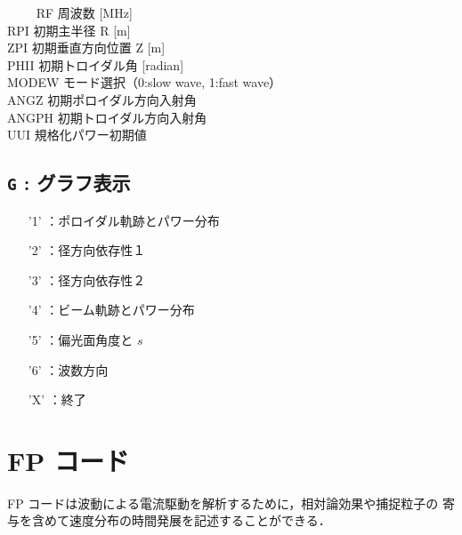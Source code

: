 \documentclass[11pt]{jarticle}
\begin{document}
\begin{itemize}
\begin{tabbing}
　　  \> RF    \>周波数 [MHz] \\
      \> RPI   \>初期主半径 R [m] \\
      \> ZPI   \>初期垂直方向位置 Z [m]\\
      \> PHII  \>初期トロイダル角 [radian]\\
      \> MODEW \>モード選択（0:slow wave, 1:fast wave）\\
      \> ANGZ  \>初期ポロイダル方向入射角 \\
      \> ANGPH \>初期トロイダル方向入射角\\
      \> UUI   \>規格化パワー初期値\\
\end{tabbing}   
\end{itemize}

\subsection{{\tt G} : グラフ表示}
\begin{itemize}
\item['1']：ポロイダル軌跡とパワー分布
\item['2']：径方向依存性１
\item['3']：径方向依存性２
\item['4']：ビーム軌跡とパワー分布
\item['5']：偏光面角度と $s$
\item['6']：波数方向
\item['X']：終了
\end{itemize}




\section{FP コード}
FP コードは波動による電流駆動を解析するために，相対論効果や捕捉粒子の
寄与を含めて速度分布の時間発展を記述することができる．
\end{document}
